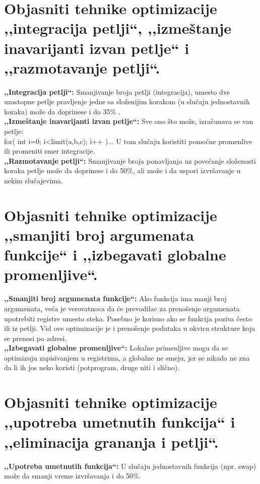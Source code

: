 \documentclass[a4paper]{article}
\begin{document}
\section{Objasniti tehnike optimizacije ,,integracija petlji``, ,,izmeštanje inavarijanti izvan petlje``
         i ,,razmotavanje petlji``.}
  
  \textbf{,,Integracija petlji``:} Smanjivanje broja petlji (integracija), umesto dve uzastopne 
  petlje pravljenje jedne sa složenijim korakom (u slučaju jednostavnih koraka) može da doprinese i 
  do 35\% . \\
  
  \textbf{,,Izmeštanje inavarijanti izvan petlje``:} Sve ono što može, izračunava se van petlje:\\
  \indent for( int i=0; i<limit(a,b,c); i++ )... U tom slučaju koristiti pomoćne promenlive ili
  promeniti smer integracije. \\

  \textbf{,,Razmotavanje petlji``:} Smanjivanje broja ponavljanja uz povećanje složenosti koraka petlje može da doprinese i do 50\%, 
  ali može i da uspori izvršavanje u nekim slučajevima.
  
\section{Objasniti tehnike optimizacije ,,smanjiti broj argumenata funkcije`` i 
         ,,izbegavati globalne promenljive``.}
  \textbf{,,Smanjiti broj argumenata funkcije``:} Ako funkcija ima manji broj argumenata, 
  veća je verovatnoca da će prevodilac za prenošenje argumenata upotrebiti registre umesto steka. 
  Posebno je korisno ako se funkcija poziva često ili iz petlji. 
  Vid ove optimizacije je i prenošenje podataka u okviru strukture koja se prenosi po adresi.\\
  
  \textbf{,,Izbegavati globalne promenljive``:} Lokalne primenljive mogu da se optimizuju zapisivanjem 
  u registrima, a globalne ne smeju, jer se nikada ne zna da li ih jos neko koristi (potprogram, 
  druge niti i slično).
  
\section{Objasniti tehnike optimizacije ,,upotreba umetnutih funkcija`` i 
         ,,eliminacija grananja i petlji``.}
  
  \textbf{,,Upotreba umetnutih funkcija``:} U slučaju jednostavnih funkcija (npr. swap) može da smanji 
  vreme izvršavanja i do 50\%.\\
  
\end{document}
